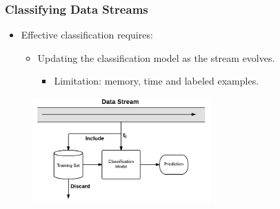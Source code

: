 \documentclass[14pt]{beamer}
\begin{document}







\begin{frame}\frametitle{Classifying Data Streams}

\begin{itemize}
\item Effective classification requires:
\begin{itemize}
\item Updating the classification model as the stream evolves.
\begin{itemize}
\item Limitation: memory, time and labeled examples.
\end{itemize}
\end{itemize}
\end{itemize}

\vspace{-0.2in}
\begin{figure}
\centering
\includegraphics[height=1.60in]{Stream2}
\end{figure}
\end{frame}
\end{document}
